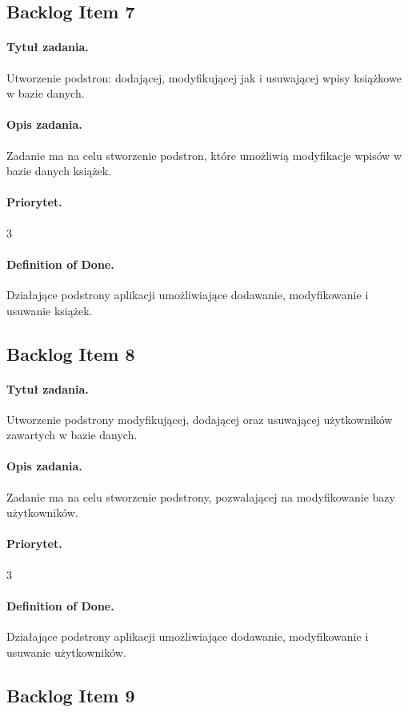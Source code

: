 \documentclass[a4paper]{article}
\begin{document}
\subsection{Backlog Item 7}
\paragraph{Tytuł zadania.} Utworzenie podstron: dodającej, modyfikującej jak i usuwającej wpisy książkowe w bazie danych.
\paragraph{Opis zadania.} Zadanie ma na celu stworzenie podstron, które umożliwią modyfikacje wpisów w bazie danych książek.
\paragraph{Priorytet.} 3
\paragraph{Definition of Done.} Działające podstrony aplikacji umożliwiające dodawanie, modyfikowanie i usuwanie książek.

\subsection{Backlog Item 8}
\paragraph{Tytuł zadania.} Utworzenie podstrony modyfikującej, dodającej oraz usuwającej użytkowników zawartych w bazie danych.
\paragraph{Opis zadania.} Zadanie ma na celu stworzenie podstrony, pozwalającej na modyfikowanie bazy użytkowników.
\paragraph{Priorytet.} 3
\paragraph{Definition of Done.}Działające podstrony aplikacji umożliwiające dodawanie, modyfikowanie i usuwanie użytkowników.

\subsection{Backlog Item 9}
\end{document}
